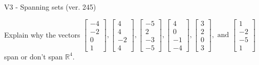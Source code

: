\begin{exercise}
  \begin{exerciseTitle}V3 - Spanning sets (ver. 245)\end{exerciseTitle}
  \begin{exerciseStatement}
    Explain why the vectors \(\left[\begin{array}{r}
-4 \\
-2 \\
0 \\
1
\end{array}\right] , \left[\begin{array}{r}
4 \\
4 \\
-2 \\
4
\end{array}\right] , \left[\begin{array}{r}
-5 \\
2 \\
-3 \\
-5
\end{array}\right] , \left[\begin{array}{r}
4 \\
0 \\
-1 \\
-4
\end{array}\right] , \left[\begin{array}{r}
3 \\
2 \\
0 \\
3
\end{array}\right] , \text{ and } \left[\begin{array}{r}
1 \\
-2 \\
-5 \\
1
\end{array}\right]\) span or don't span \(\mathbb{R}^4\). 
	



\end{exerciseStatement}
\end{exercise}
